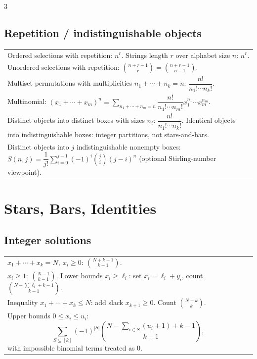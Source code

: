 \documentclass[10pt]{article}
\begin{document}
\begin{multicols*}{3}
\subsection*{Repetition / indistinguishable objects}
\begin{tabular}{@{}p{}@{}}
Ordered selections with repetition: \(n^r\). Strings length \(r\) over alphabet size \(n\): \(n^r\).\\
Unordered selections with repetition: \(\binom{n+r-1}{r}=\binom{n+r-1}{n-1}\).\\
Multiset permutations with multiplicities \(n_1+\cdots+n_k=n\):
\(\dfrac{n!}{n_1!\cdots n_k!}\).\\
Multinomial: \((x_1+\cdots+x_m)^n=\sum_{n_1+\cdots+n_m=n}\dfrac{n!}{n_1!\cdots n_m!}x_1^{n_1}\cdots x_m^{n_m}\).\\
Distinct objects into distinct boxes with sizes \(n_i\): \(\dfrac{n!}{n_1!\cdots n_k!}\). Identical objects into indistinguishable boxes: integer partitions, not stars-and-bars.\\
Distinct objects into \(j\) indistinguishable nonempty boxes: \(S(n,j)=\dfrac1{j!}\sum_{i=0}^{j-1}(-1)^i\binom ji(j-i)^n\) (optional Stirling-number viewpoint).\\
\end{tabular}

\section*{Stars, Bars, Identities}
\subsection*{Integer solutions}
\begin{tabular}{@{}p{}@{}}
\(x_1+\cdots+x_k=N,\ x_i\ge0:\ \binom{N+k-1}{k-1}\).\\
\(x_i\ge1:\ \binom{N-1}{k-1}\). Lower bounds \(x_i\ge \ell_i\): set \(x_i=\ell_i+y_i\), count \(\binom{N-\sum\ell_i+k-1}{k-1}\).\\
Inequality \(x_1+\cdots+x_k\le N\): add slack \(x_{k+1}\ge0\). Count \(\binom{N+k}{k}\).\\
Upper bounds \(0\le x_i\le u_i\):
\[
\sum_{S\subseteq[k]}(-1)^{|S|}\binom{N-\sum_{i\in S}(u_i+1)+k-1}{k-1},
\]
with impossible binomial terms treated as \(0\).\\
\end{tabular}


\end{multicols*}
\end{document}
